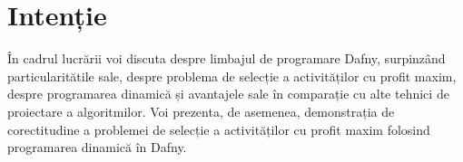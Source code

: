 \chapter*{Intenție} 

În cadrul lucrării voi discuta despre limbajul de programare Dafny, surpinzând particularitătile sale, despre problema de selecție a activităților cu profit maxim, despre programarea dinamică și avantajele sale în comparație cu alte tehnici de proiectare a algoritmilor. 
Voi prezenta, de asemenea, demonstrația de corectitudine a problemei de selecție a activităților cu profit maxim folosind programarea dinamică în Dafny.  